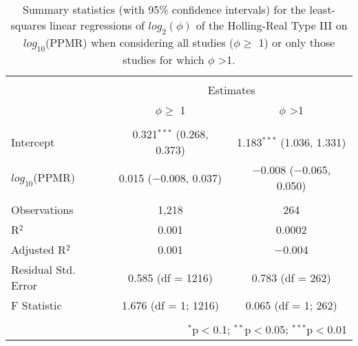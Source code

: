 
\begin{table}[!htbp] \centering 
  \caption{Summary statistics (with 95\% confidence intervals) for the least-squares linear regressions of $log_2(\phi)$ of the Holling-Real Type III on $log_{10}$(PPMR) when considering all studies ($\phi \geq$ 1) or only those studies for which $\phi$ \textgreater 1.} 
  \label{tab:n-ppmr} 
\begin{tabular}{@{\extracolsep{5pt}}lcc} 
\\[-1.8ex]\hline 
\hline \\[-1.8ex] 
 & \multicolumn{2}{c}{Estimates} \\ 
\cline{2-3} 
 & $\phi \geq$ 1 & $\phi$ \textgreater 1 \\ 
\hline \\[-1.8ex] 
 Intercept & 0.321$^{***}$ (0.268, 0.373) & 1.183$^{***}$ (1.036, 1.331) \\ 
  $log_{10}$(PPMR) & 0.015 ($-$0.008, 0.037) & $-$0.008 ($-$0.065, 0.050) \\ 
 \hline \\[-1.8ex] 
Observations & 1,218 & 264 \\ 
R$^{2}$ & 0.001 & 0.0002 \\ 
Adjusted R$^{2}$ & 0.001 & $-$0.004 \\ 
Residual Std. Error & 0.585 (df = 1216) & 0.783 (df = 262) \\ 
F Statistic & 1.676 (df = 1; 1216) & 0.065 (df = 1; 262) \\ 
\hline 
\hline \\[-1.8ex] 
\multicolumn{3}{r}{$^{*}$p$<$0.1; $^{**}$p$<$0.05; $^{***}$p$<$0.01} \\ 
\end{tabular} 
\end{table} 
